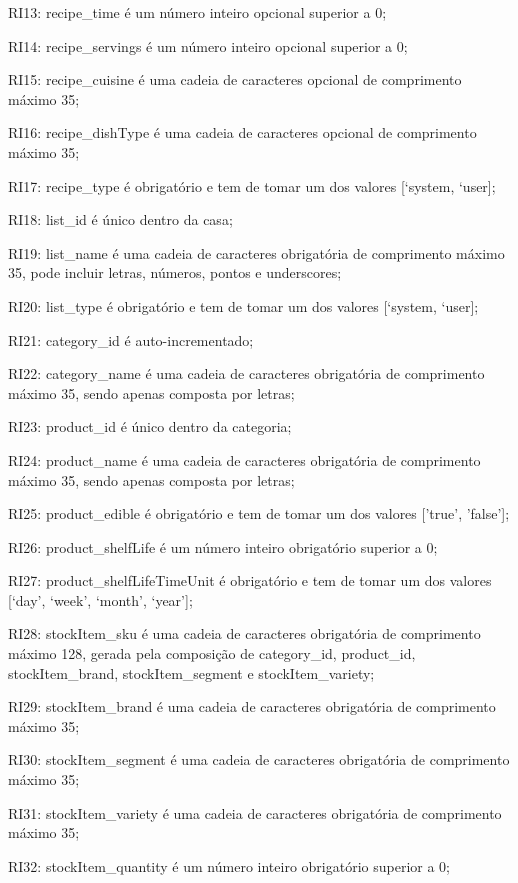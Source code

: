 \begin{description}
	\item RI13: recipe\_time é um número inteiro opcional superior a 0;
	\item RI14: recipe\_servings é um número inteiro opcional superior a 0;
	\item RI15: recipe\_cuisine é uma cadeia de caracteres opcional de comprimento máximo 35;
	\item RI16: recipe\_dishType é uma cadeia de caracteres opcional de comprimento máximo 35;
	\item RI17: recipe\_type é obrigatório e tem de tomar um dos valores [‘system, ‘user];
	\item RI18: list\_id é único dentro da casa;
	\item RI19: list\_name é uma cadeia de caracteres obrigatória de comprimento máximo 35, pode incluir letras, números, pontos e underscores;
	\item RI20: list\_type é obrigatório e tem de tomar um dos valores [‘system, ‘user];
	\item RI21: category\_id é auto-incrementado;
	\item RI22: category\_name é uma cadeia de caracteres obrigatória de comprimento máximo 35, sendo apenas composta por letras;
	\item RI23: product\_id é único dentro da categoria;
	\item RI24: product\_name é uma cadeia de caracteres obrigatória de comprimento máximo 35, sendo apenas composta por letras;
	\item RI25: product\_edible é obrigatório e tem de tomar um dos valores ['true', 'false'];
	\item RI26: product\_shelfLife é um número inteiro obrigatório superior a 0;
	\item RI27: product\_shelfLifeTimeUnit é obrigatório e tem de tomar um dos valores [‘day’, ‘week’, ‘month’, ‘year’];
	\item RI28: stockItem\_sku é uma cadeia de caracteres obrigatória de comprimento máximo 128, gerada pela composição de category\_id, product\_id, stockItem\_brand, stockItem\_segment e stockItem\_variety;
	\item RI29: stockItem\_brand é uma cadeia de caracteres obrigatória de comprimento máximo 35;
	\item RI30: stockItem\_segment é uma cadeia de caracteres obrigatória de comprimento máximo 35;
	\item RI31: stockItem\_variety é uma cadeia de caracteres obrigatória de comprimento máximo 35;
	\item RI32: stockItem\_quantity é um número inteiro obrigatório superior a 0;

\end{description}
